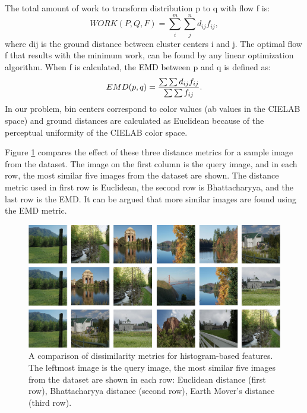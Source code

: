 The total amount of work to transform distribution
p to q with flow f is:
\begin{equation}
WORK(P,Q,F) = \sum_i^m \sum_j^n d_{ij}f_{ij}, 
\end{equation}
where dij is the ground distance between cluster centers i and j. The optimal flow f that results with the minimum work, can be found by any linear optimization algorithm. When f is calculated, the EMD between p and q is defined as:
\begin{equation}
EMD(p,q) = {{\sum \sum d_{ij}f_{ij}}\over{\sum \sum f_{ij}}}.
\end{equation}
In our problem, bin centers correspond to color values
(ab values in the CIELAB space) and ground distances
are calculated as Euclidean because of the perceptual
uniformity of the CIELAB color space.

Figure \ref{fig:sim_comp} compares the effect of these three distance
metrics for a sample image from the dataset. The image
on the first column is the query image, and in each row,
the most similar five images from the dataset are shown.
The distance metric used in first row is Euclidean, the
second row is Bhattacharyya, and the last row is the
EMD. It can be argued that more similar images are
found using the EMD metric.

\begin{figure} 
\centering
\caption{A comparison of dissimilarity metrics for histogram-based features. The leftmost image is the query image, the most similar five images from the dataset are shown in each row: Euclidean distance (first row), Bhattacharyya distance (second row), Earth Mover’s distance (third row).}
\label{fig:sim_comp}
\includegraphics[width=\textwidth]{figures/chapter2/16sims.png}
\vspace{10pt}
\end{figure}

